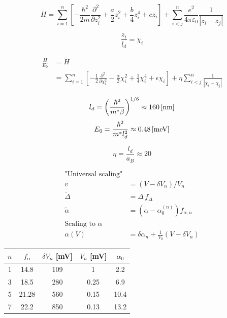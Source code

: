 \documentclass[prb,twocolumn,showpacs,preprintnumbers,amsmath,amssymb, superscriptaddress]{revtex4-2}
\newcommand{\1}{{1\hspace*{-0.5ex} \textrm{l} \hspace*{0.5ex}}}
\begin{document}
\begin{equation}\label{dimfull_Hamiltonian}
H = \sum_{i = 1}^n \left[ -\frac{\hbar^2}{2m}\frac{\partial^2}{\partial z_i^2} + \frac{a}{2} z_i^2 + \frac{b}{4}z_i^4 + {c} z_i  \right] + \sum_{i<j}^n \frac{e^2}{4 \pi \varepsilon_0}\frac{1}{\left| z_i - z_j  \right|}
\end{equation}

\begin{equation}
\frac{z_i}{l_d} = \chi_i
\end{equation}

\begin{align}\label{dimless_Hamiltonian}
\frac{H}{E_0} &= \tilde{H} \\
 &= \sum_{i = 1}^n \left[ -\frac{1}{2}\frac{\partial^2}{\partial \chi_i^2} - \frac{\alpha}{2}\chi_i^2 + \frac{1}{4} \chi_i^4 + \epsilon \chi_i \right] + \eta \sum_{i < j}^n \frac{1}{\left| \chi_i - \chi_j  \right|}
\end{align}


\begin{equation}
l_d = \left( \frac{\hbar^2}{m^* \beta} \right)^{1/6} \approx 160 \,{\rm{ [nm]}}
\end{equation}
\begin{equation}
E_0 = \frac{\hbar^2}{m^* l_d^2} \approx 0.48 \,{\rm{ [meV]}}
\end{equation}

\begin{equation}\label{dimless_interaction_param}
\eta = \frac{l_d}{a_B} \approx 20
\end{equation}

\begin{align}
{\text{"Universal scaling"}}\\
v &= (V - \delta V_{n})/V_n \\
\tilde{\Delta} &= \Delta\, f_\Delta \\
\tilde{\alpha} &= (\alpha - \alpha_0^{(n)}) f_{\alpha, n} \\
{\text{Scaling to }} \alpha \\
\alpha(V) &= \delta\alpha_n + \frac{1}{V_0} \left(V - \delta V_n  \right)
\end{align}

\begin{table}[h!]
\begin{tabular}{|c|c|c|c|c|}
\hline
$n$ & $f_\alpha$   & $\delta V_n$ [mV] & $V_n$ [mV]  & $\alpha_0$ \\ \hline
1 & 14.8  & 109  & 1    & 2.2     \\ \hline
3 & 18.5  & 280  & 0.25 & 6.9     \\ \hline
5 & 21.28 & 560  & 0.15 & 10.4    \\ \hline
7 & 22.2  & 850  & 0.13 & 13.2    \\ \hline
\end{tabular}
\end{table}
\end{document}
